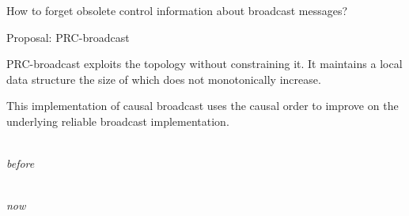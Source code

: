 \documentclass[10pt, xcolor={usenames, dvipsnames}]{beamer}
\begin{document}
%     
  


\begin{frame}[standout] 

  \vspace{2em}

  How to forget obsolete control information about broadcast messages?

  \vspace{2em}

  \begin{center}
    
  \end{center}

\end{frame}


\begin{frame}{Proposal: PRC-broadcast}

  \vspace{1em}
  
  PRC-broadcast exploits the topology without constraining it. It maintains a
  local data structure the size of which does not monotonically increase.

  \vspace{1.5em}
  
  This implementation of causal broadcast uses the causal order to improve on
  the underlying reliable broadcast implementation.

  \vspace{0.5em}
  
  \begin{minipage}{0.49\textwidth}
    \begin{center}
      \\
      \small\textit{before}
    \end{center}
  \end{minipage}
  \begin{minipage}{0.49\textwidth}
    \begin{center}
      \\
      \small\textit{now}
    \end{center}
  \end{minipage}

\end{frame}
\end{document}
